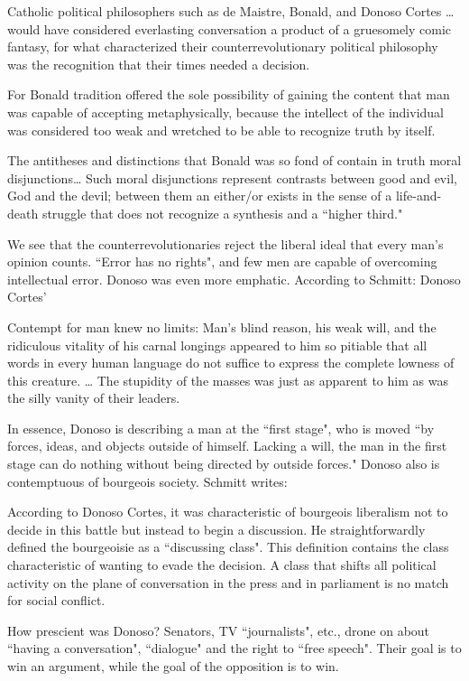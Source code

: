 \begin{quotex}
Catholic political philosophers such as de Maistre, Bonald, and Donoso Cortes … would have considered everlasting conversation a product of a gruesomely comic fantasy, for what characterized their counterrevolutionary political philosophy was the recognition that their times needed a decision. 

\end{quotex}
For Bonald tradition offered the sole possibility of gaining the content that man was capable of accepting metaphysically, because the intellect of the individual was considered too weak and wretched to be able to recognize truth by itself.

\begin{quotex}
The antitheses and distinctions that Bonald was so fond of contain in truth moral disjunctions… Such moral disjunctions represent contrasts between good and evil, God and the devil; between them an either/or exists in the sense of a life-and-death struggle that does not recognize a synthesis and a ``higher third." 

\end{quotex}
We see that the counterrevolutionaries reject the liberal ideal that every man's opinion counts. ``Error has no rights", and few men are capable of overcoming intellectual error. Donoso was even more emphatic. According to Schmitt: Donoso Cortes'

\begin{quotex}
Contempt for man knew no limits: Man's blind reason, his weak will, and the ridiculous vitality of his carnal longings appeared to him so pitiable that all words in every human language do not suffice to express the complete lowness of this creature. … The stupidity of the masses was just as apparent to him as was the silly vanity of their leaders. 

\end{quotex}
In essence, Donoso is describing a man at the ``first stage", who is moved ``by forces, ideas, and objects outside of himself. Lacking a will, the man in the first stage can do nothing without being directed by outside forces." Donoso also is contemptuous of bourgeois society. Schmitt writes:

\begin{quotex}
According to Donoso Cortes, it was characteristic of bourgeois liberalism not to decide in this battle but instead to begin a discussion. He straightforwardly defined the bourgeoisie as a ``discussing class". This definition contains the class characteristic of wanting to evade the decision. A class that shifts all political activity on the plane of conversation in the press and in parliament is no match for social conflict. 

\end{quotex}
How prescient was Donoso? Senators, TV ``journalists", etc., drone on about ``having a conversation", ``dialogue" and the right to ``free speech". Their goal is to win an argument, while the goal of the opposition is to win.

